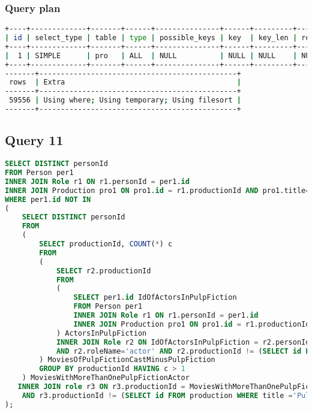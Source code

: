 \subsubsection{Query plan}
\begin{lstlisting}[language=bash]
+----+-------------+-------+------+---------------+------+---------+------+
| id | select_type | table | type | possible_keys | key  | key_len | ref  |
+----+-------------+-------+------+---------------+------+---------+------+
|  1 | SIMPLE      | pro   | ALL  | NULL          | NULL | NULL    | NULL |
+----+-------------+-------+------+---------------+------+---------+------+
-------+----------------------------------------------+
 rows  | Extra                                        |
-------+----------------------------------------------+
 59556 | Using where; Using temporary; Using filesort |
-------+----------------------------------------------+
\end{lstlisting}


\bigskip
\subsection{Query 11}
\begin{lstlisting}[language=sql]
SELECT DISTINCT personId
FROM Person per1 
INNER JOIN Role r1 ON r1.personId = per1.id
INNER JOIN Production pro1 ON pro1.id = r1.productionId AND pro1.title='Pulp Fiction' AND r1.roleName='actor'
WHERE per1.id NOT IN 
( 
    SELECT DISTINCT personId
    FROM 
    (
        SELECT productionId, COUNT(*) c
        FROM
        (
            SELECT r2.productionId 
            FROM
            (
                SELECT per1.id IdOfActorsInPulpFiction
                FROM Person per1
                INNER JOIN Role r1 ON r1.personId = per1.id
                INNER JOIN Production pro1 ON pro1.id = r1.productionId AND pro1.title='Pulp Fiction' AND r1.roleName='actor'         
            ) ActorsInPulpFiction
            INNER JOIN Role r2 ON IdOfActorsInPulpFiction = r2.personId
            AND r2.roleName='actor' AND r2.productionId != (SELECT id FROM production WHERE title ='Pulp Fiction')
        ) MoviesOfPulpFictionCastMinusPulpFiction
        GROUP BY productionId HAVING c > 1
    ) MoviesWithMoreThanOnePulpFictionActor 
   INNER JOIN role r3 ON r3.productionId = MoviesWithMoreThanOnePulpFictionActor.productionId
    AND r3.productionId != (SELECT id FROM production WHERE title ='Pulp Fiction')
);
\end{lstlisting}

